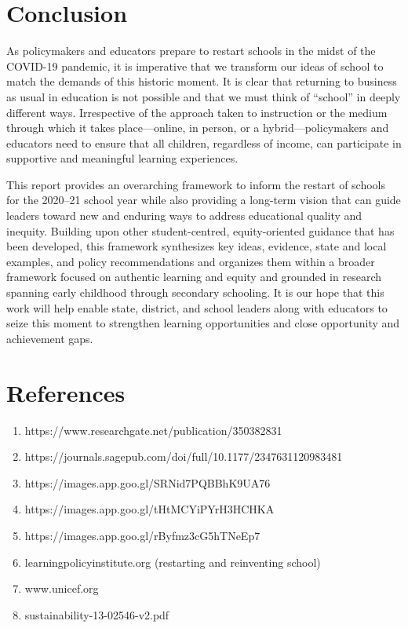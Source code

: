 \documentclass[11pt]{scrartcl}
\begin{document}
\pagebreak

	\section{Conclusion}
	
	As policymakers and educators prepare to restart schools in the midst of the COVID-19 pandemic, it is imperative that we transform our ideas of school to match the demands of this historic moment. It is clear that returning to business as usual in education is not possible and that we must think of “school” in deeply different ways. Irrespective of the approach taken to instruction or the medium through which it takes place—online, in person, or a hybrid—policymakers and educators need to ensure that all children, regardless of income, can participate in supportive and meaningful learning experiences. 
	
	This report provides an overarching framework to inform the restart of schools for the 2020–21 school year while also providing a long-term vision that can guide leaders toward new and enduring ways to address educational quality and inequity. Building upon other student-centred, equity-oriented guidance that has been developed, this framework synthesizes key ideas, evidence, state and local examples, and policy recommendations and organizes them within a broader framework focused on authentic learning and equity and grounded in research spanning early childhood through secondary schooling. It is our hope that this work will help enable state, district, and school leaders along with educators to seize this moment to strengthen learning opportunities and close opportunity and achievement gaps.
	
	\section{References}
	
	\begin{enumerate}
		\item https://www.researchgate.net/publication/350382831
		
		\item https://journals.sagepub.com/doi/full/10.1177/2347631120983481
		
		\item https://images.app.goo.gl/SRNid7PQBBhK9UA76
		
		\item https://images.app.goo.gl/tHtMCYiPYrH3HCHKA
		
		\item https://images.app.goo.gl/rByfmz3cG5hTNeEp7
		
		\item learningpolicyinstitute.org (restarting and reinventing school)
		
		\item www.unicef.org
		
		\item sustainability-13-02546-v2.pdf
		
	\end{enumerate}
\end{document}
